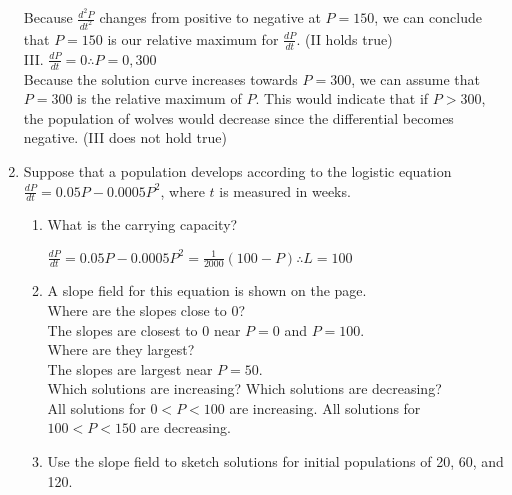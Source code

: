 \documentclass[10pt,letterpaper]{report}
\begin{document}
\begin{enumerate}
    Because $\frac{d^{2}P}{dt^{2}}$ changes from positive to negative at $P=150$, we can conclude that $P=150$ is our relative maximum for $\frac{dP}{dt}$. (II holds true) \\
    
    III. $\frac{dP}{dt}=0\therefore P=0, 300$ \\
    
    Because the solution curve increases towards $P=300$, we can assume that $P=300$ is the relative maximum of $P$. This would indicate that if $P>300$, the population of wolves would decrease since the differential becomes negative. (III does not hold true) \\
    
    \pagebreak
    
  \item{Suppose that a population develops according to the logistic equation $\frac{dP}{dt}=0.05P-0.0005P^{2}$, where $t$ is measured in weeks.}
  \begin{enumerate}
    \item{What is the carrying capacity? \\}
    
      $\frac{dP}{dt}=0.05P-0.0005P^{2}=\frac{1}{2000}\left(100-P\right)\therefore L=100$ \\
      
    \item{A slope field for this equation is shown on the page. \\
    Where are the slopes close to 0? \\
    
    The slopes are closest to 0 near $P=0$ and $P=100$. \\
    
    Where are they largest? \\
    
    The slopes are largest near $P=50$. \\
    
    Which solutions are increasing? Which solutions are decreasing? \\
    
    All solutions for $0<P<100$ are increasing. All solutions for $100<P<150$ are decreasing. \\
    
    }
    
    \item{Use the slope field to sketch solutions for initial populations of 20, 60, and 120. \\
    
}
\end{enumerate}
\end{enumerate}
\end{document}
